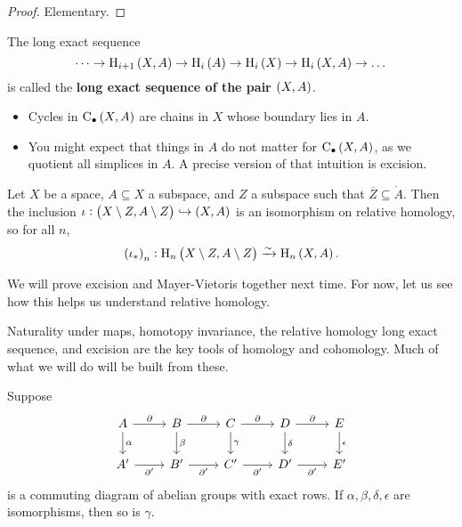 \begin{proof}
Elementary.
\end{proof}

The long exact sequence
$$ \dots \to \H_{i + 1}\br{X, A} \to \H_i\br{A} \to \H_i\br{X} \to \H_i\br{X, A} \to \dots $$
is called the \textbf{long exact sequence of the pair $ \br{X, A} $}.

\begin{remark*}
\hfill
\begin{itemize}
\item Cycles in $ \C_\bullet\br{X, A} $ are chains in $ X $ whose boundary lies in $ A $.
\item You might expect that things in $ A $ do not matter for $ \C_\bullet\br{X, A} $, as we quotient all simplices in $ A $. A precise version of that intuition is excision.
\end{itemize}
\end{remark*}

\begin{theorem}[Excision]
Let $ X $ be a space, $ A \subseteq X $ a subspace, and $ Z $ a subspace such that $ \overline{Z} \subseteq \mathring{A} $. Then the inclusion $ \iota : \br{X \setminus Z, A \setminus Z} \hookrightarrow \br{X, A} $ is an isomorphism on relative homology, so for all $ n $,
$$ \br{\iota_*}_n : \H_n\br{X \setminus Z, A \setminus Z} \xrightarrow{\sim} \H_n\br{X, A}. $$
\end{theorem}

We will prove excision and Mayer-Vietoris together next time. For now, let us see how this helps us understand relative homology.

\begin{remark*}
Naturality under maps, homotopy invariance, the relative homology long exact sequence, and excision are the key tools of homology and cohomology. Much of what we will do will be built from these.
\end{remark*}

\begin{lemma}[$ 5 $-lemma]
Suppose
$$
\begin{tikzcd}
A \arrow{r}{\da} \arrow{d}{\alpha} & B \arrow{r}{\da} \arrow{d}{\beta} & C \arrow{r}{\da} \arrow{d}{\gamma} & D \arrow{r}{\da} \arrow{d}{\delta} & E \arrow{d}{\epsilon} \\
A' \arrow{r}[swap]{\da'} & B' \arrow{r}[swap]{\da'} & C' \arrow{r}[swap]{\da'} & D' \arrow{r}[swap]{\da'} & E'
\end{tikzcd}
$$
is a commuting diagram of abelian groups with exact rows. If $ \alpha, \beta, \delta, \epsilon $ are isomorphisms, then so is $ \gamma $.
\end{lemma}

